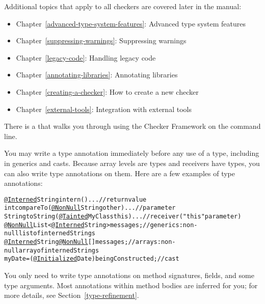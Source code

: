 Additional topics that apply to all checkers are covered later in the manual:
\begin{itemize}
\item Chapter~\ref{advanced-type-system-features}: Advanced type system features
\item Chapter~\ref{suppressing-warnings}: Suppressing warnings
\item Chapter~\ref{legacy-code}: Handling legacy code
\item Chapter~\ref{annotating-libraries}: Annotating libraries
\item Chapter~\ref{creating-a-checker}: How to create a new checker
\item Chapter~\ref{external-tools}: Integration with external tools
\end{itemize}


There is a
that walks you through using the Checker Framework on the
command line.




You may write a type annotation immediately before any
use of a type, including in generics and casts.  Because array levels are
types and receivers have types, you can also write type annotations on
them.  Here are a few examples of type annotations:

\begin{smaller}
\begin{alltt}
  \underline{@Interned} String intern() \ttlcb{} ... \ttrcb{}               // return value
  int compareTo(\underline{@NonNull} String other) \ttlcb{} ... \ttrcb{}    // parameter
  String toString(\underline{@Tainted} MyClass this) \ttlcb{} ... \ttrcb{}  // receiver ("this" parameter)
  \underline{@NonNull} List<\underline{@Interned} String> messages;       // generics:  non-null list of interned Strings
  \underline{@Interned} String \underline{@NonNull} [] messages;          // arrays:  non-null array of interned Strings
  myDate = (\underline{@Initialized} Date) beingConstructed;  // cast
\end{alltt}
\end{smaller}

You only need to write type annotations on method signatures, fields, and some type arguments.
Most annotations within method bodies are inferred for you; for more details,
see  Section~\ref{type-refinement}.

